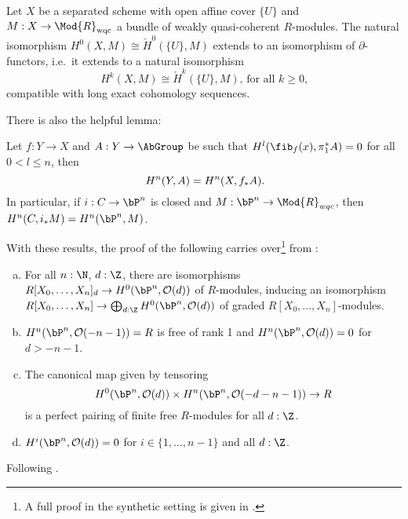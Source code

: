 \begin{theorem}
  Let $X$ be a separated scheme with open affine cover $\{U\}$ and $M:X\to \Mod{R}_{\mathrm{wqc}}$ a bundle of weakly quasi-coherent $R$-modules.
  The natural isomorphism $H^0(X,M) \cong \check{H}^0(\{U\},M)$ extends to an isomorphism of $\partial$-functors,
  i.e.\ it extends to a natural isomorphism
  \[ H^k(X,M) \cong \check{H}^k(\{U\},M)\text{, for all $k\geq 0$,}
  \]
  compatible with long exact cohomology sequences.
\end{theorem}

There is also the helpful lemma:


\begin{lemma}
  \label{cohomologically-trivial-fibers}
  Let $f:Y\to X$ and $A:Y\to\AbGroup$ be such that $H^l(\fib_f(x),\pi_1^\ast A)=0$ for all $0<l\leq n$,
  then
  \[
  H^n(Y,A)=H^n(X,f_\ast A)
  \rlap{.}
  \]
  In particular, if $i:C\to \bP^n$ is closed and $M:\bP^n\to\Mod{R}_{wqc}$, then $H^n(C,i_\ast M)=H^n(\bP^n,M)$.
\end{lemma}

With these results, the proof of the following carries over\footnote{A full proof in the synthetic setting is given in \cite{cech-draft}.}
from \cite[Chapter III]{Hartshorne}:

\begin{theorem}
  \label{calculate-cohomology-twisting-sheaves}
  \begin{enumerate}[(a)]
  \item \label{calculate-cohomology-twisting-sheaves-a}
  For all $n:\N$, $d:\Z$, there are isomorphisms $R[X_0,\dots,X_n]_d\to H^0(\bP^n,\mathcal O(d))$ of $R$-modules, inducing an isomorphism $R[X_0,\dots,X_n]\to \bigoplus_{d:\Z} H^0(\bP^n,\mathcal O(d))$ of graded $R[X_0,\dots,X_n]$-modules.
  \item \label{calculate-cohomology-twisting-sheaves-b}
        $H^n(\bP^n,\mathcal O(-n-1))=R$ is free of rank 1 and $H^n(\bP^n,\mathcal O(d))=0$ for $d>-n-1$.
  \item \label{calculate-cohomology-twisting-sheaves-c}
    The canonical map given by tensoring
    \[
      H^0(\bP^n,\mathcal O(d)) \times H^n(\bP^n,\mathcal O(-d-n-1))\to R
    \]
    is a perfect pairing of finite free $R$-modules for all $d:\Z$.
  \item $H^i(\bP^n,\mathcal O(d))=0$ for $i\in\{1,\dots,n-1\}$ and all $d:\Z$.
  \end{enumerate}
\end{theorem}


Following \cite[Chapter 19]{vakil}.
